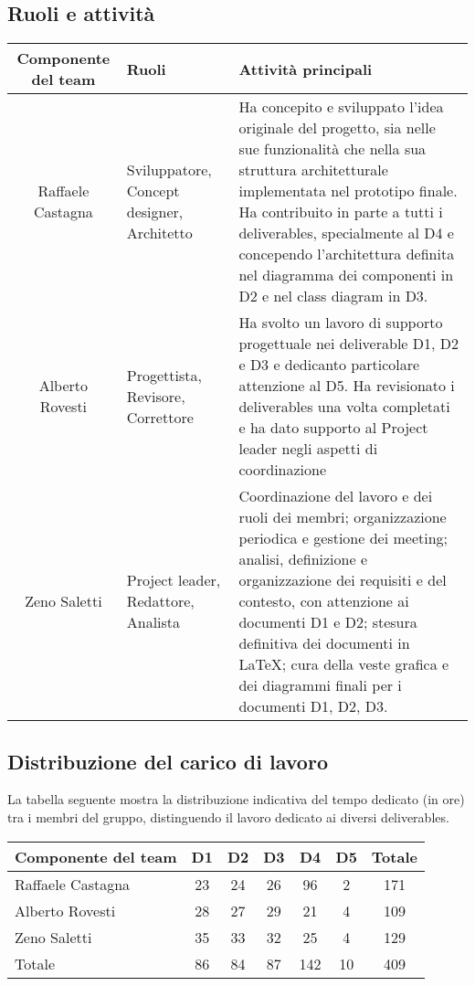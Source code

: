 \documentclass[11pt, a4paper]{article}
\theoremstyle{definition}
\begin{document}
\subsection{Ruoli e attività}
\begin{center}
  \footnotesize
  \begin{tabularx}{\textwidth}{|c||X||X|}
      \hline
      \cellcolor{red!70}Componente del team & \cellcolor{red!70}Ruoli & \cellcolor{red!70}Attività principali\\
      \hline
      Raffaele Castagna & Sviluppatore, Concept designer, Architetto& Ha concepito e sviluppato l'idea originale del progetto, sia nelle sue funzionalità che nella sua struttura architetturale implementata nel prototipo finale. Ha contribuito in parte a tutti i deliverables, specialmente al D4 e concependo l'architettura definita nel diagramma dei componenti in D2 e nel class diagram in D3.\\
      \hline
      Alberto Rovesti & Progettista, Revisore, Correttore & Ha svolto un lavoro di supporto progettuale nei deliverable D1, D2 e D3 e dedicanto particolare attenzione al D5. Ha revisionato i deliverables una volta completati e ha dato supporto al Project leader negli aspetti di coordinazione\\
      \hline
      Zeno Saletti & Project leader, Redattore, Analista & Coordinazione del lavoro e dei ruoli dei membri; organizzazione periodica e gestione dei meeting; analisi, definizione e organizzazione dei requisiti e del contesto, con attenzione ai documenti D1 e D2; stesura definitiva dei documenti in \LaTeX; cura della veste grafica e dei diagrammi finali per i documenti D1, D2, D3.\\
      \hline
  \end{tabularx}
\end{center}

\subsection{Distribuzione del carico di lavoro}
La tabella seguente mostra la distribuzione indicativa del tempo dedicato
(in ore) tra i membri del gruppo, distinguendo il lavoro dedicato ai diversi
deliverables.
\begin{center}
  \footnotesize
  \begin{tabularx}{\textwidth}{|X||c||c||c||c||c||c|}
      \hline
      \cellcolor{red!70}Componente del team & \cellcolor{red!70}D1 & \cellcolor{red!70}D2 & \cellcolor{red!70}D3 & \cellcolor{red!70}D4 & \cellcolor{red!70}D5 & \cellcolor{red!70}Totale\\
      \hline
      Raffaele Castagna &23&24&26&96&2&171\\
      \hline
      Alberto Rovesti &28&27&29&21&4&109\\
      \hline
      Zeno Saletti &35&33&32&25&4&129\\
      \hline
      \cellcolor{red!70}Totale &86&84&87&142&10&409\\
      \hline
  \end{tabularx}
\end{center}
\end{document}
